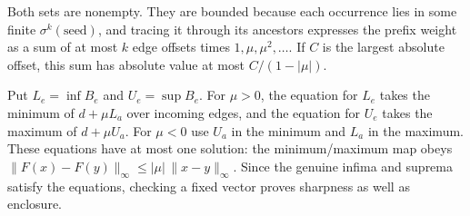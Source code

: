 \documentclass[11pt]{article}
\begin{document}
Both sets are nonempty. They are bounded because each occurrence lies in
some finite $\sigma^k(\text{seed})$, and tracing it through its ancestors
expresses the prefix weight as a sum of at most $k$ edge offsets times
$1,\mu,\mu^2,\ldots$. If $C$ is the largest absolute offset, this sum has
absolute value at most $C/(1-|\mu|)$.

Put $L_e=\inf B_e$ and $U_e=\sup B_e$. For $\mu>0$, the equation for
$L_e$ takes the minimum of $d+\mu L_a$ over incoming edges, and the
equation for $U_e$ takes the maximum of $d+\mu U_a$. For $\mu<0$ use
$U_a$ in the minimum and $L_a$ in the maximum. These equations have at
most one solution: the minimum/maximum map obeys $\|F(x)-F(y)\|_\infty\le|\mu|\,\|x-y\|_\infty$.
Since the genuine infima and suprema satisfy the equations, checking a
fixed vector proves sharpness as well as enclosure.
\end{document}
